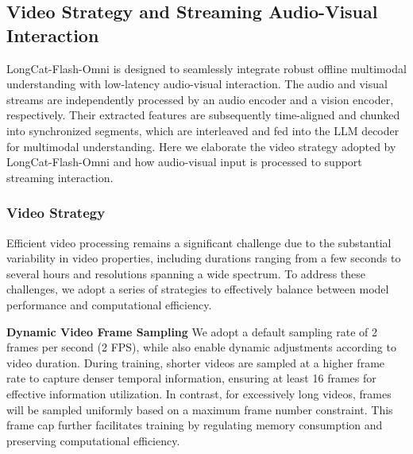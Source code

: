 \documentclass{article}
\newcommand{\longcat}{LongCat-Flash-Omni\xspace}
\begin{document}
\subsection{Video Strategy and Streaming Audio-Visual Interaction} 
\label{sec:audio-visual}

LongCat-Flash-Omni is designed to seamlessly integrate robust offline multimodal understanding with low-latency audio-visual interaction. 
The audio and visual streams are independently processed by an audio encoder and a vision encoder, respectively. Their extracted features are subsequently time-aligned and chunked into synchronized segments, which are interleaved and fed into the LLM decoder for multimodal understanding.
Here we elaborate the video strategy adopted by \longcat and how audio-visual input is processed to support streaming interaction.

\subsubsection{Video Strategy}
\label{subsec:video-strategy}
Efficient video processing remains a significant challenge due to the substantial variability in video properties, including durations ranging from a few seconds to several hours and resolutions spanning a wide spectrum. To address these challenges, we adopt a series of strategies to effectively balance between model performance and computational efficiency.

\textbf{Dynamic Video Frame Sampling} We adopt a default sampling rate of 2 frames per second (2 FPS), while also enable dynamic adjustments according to video duration.
During training, shorter videos are sampled at a higher frame rate to capture denser temporal information, ensuring at least 16 frames for effective information utilization. In contrast, for excessively long videos, frames will be sampled uniformly based on a maximum frame number constraint. This frame cap further facilitates training by regulating memory consumption and preserving computational efficiency.
\end{document}
